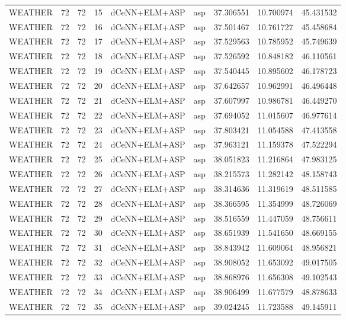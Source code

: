 \begin{table}
\begin{tabular}{lrrrllrrr}
WEATHER & 72 & 72 & 15 & dCeNN+ELM+ASP & asp & 37.306551 & 10.700974 & 45.431532 \\
WEATHER & 72 & 72 & 16 & dCeNN+ELM+ASP & asp & 37.501467 & 10.761727 & 45.458684 \\
WEATHER & 72 & 72 & 17 & dCeNN+ELM+ASP & asp & 37.529563 & 10.785952 & 45.749639 \\
WEATHER & 72 & 72 & 18 & dCeNN+ELM+ASP & asp & 37.526592 & 10.848182 & 46.110561 \\
WEATHER & 72 & 72 & 19 & dCeNN+ELM+ASP & asp & 37.540445 & 10.895602 & 46.178723 \\
WEATHER & 72 & 72 & 20 & dCeNN+ELM+ASP & asp & 37.642657 & 10.962991 & 46.496448 \\
WEATHER & 72 & 72 & 21 & dCeNN+ELM+ASP & asp & 37.607997 & 10.986781 & 46.449270 \\
WEATHER & 72 & 72 & 22 & dCeNN+ELM+ASP & asp & 37.694052 & 11.015607 & 46.977614 \\
WEATHER & 72 & 72 & 23 & dCeNN+ELM+ASP & asp & 37.803421 & 11.054588 & 47.413558 \\
WEATHER & 72 & 72 & 24 & dCeNN+ELM+ASP & asp & 37.963121 & 11.159378 & 47.522294 \\
WEATHER & 72 & 72 & 25 & dCeNN+ELM+ASP & asp & 38.051823 & 11.216864 & 47.983125 \\
WEATHER & 72 & 72 & 26 & dCeNN+ELM+ASP & asp & 38.215573 & 11.282142 & 48.158743 \\
WEATHER & 72 & 72 & 27 & dCeNN+ELM+ASP & asp & 38.314636 & 11.319619 & 48.511585 \\
WEATHER & 72 & 72 & 28 & dCeNN+ELM+ASP & asp & 38.366595 & 11.354999 & 48.726069 \\
WEATHER & 72 & 72 & 29 & dCeNN+ELM+ASP & asp & 38.516559 & 11.447059 & 48.756611 \\
WEATHER & 72 & 72 & 30 & dCeNN+ELM+ASP & asp & 38.651939 & 11.541650 & 48.669155 \\
WEATHER & 72 & 72 & 31 & dCeNN+ELM+ASP & asp & 38.843942 & 11.609064 & 48.956821 \\
WEATHER & 72 & 72 & 32 & dCeNN+ELM+ASP & asp & 38.908052 & 11.653092 & 49.017505 \\
WEATHER & 72 & 72 & 33 & dCeNN+ELM+ASP & asp & 38.868976 & 11.656308 & 49.102543 \\
WEATHER & 72 & 72 & 34 & dCeNN+ELM+ASP & asp & 38.906499 & 11.677579 & 48.878633 \\
WEATHER & 72 & 72 & 35 & dCeNN+ELM+ASP & asp & 39.024245 & 11.723588 & 49.145911 \\

\end{tabular}
\end{table}
